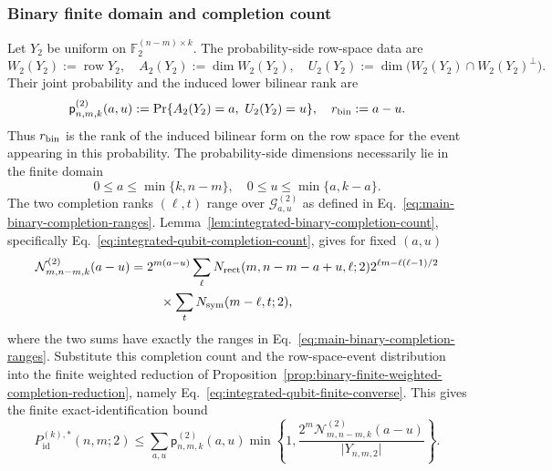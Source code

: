 \documentclass[11pt]{article}
\newcommand{\F}{\mathbb F}
\newcommand{\1}{\mathbf 1}
\theoremstyle{plain}
\theoremstyle{definition}
\theoremstyle{remark}
\begin{document}
\subsubsection{Binary finite domain and completion count}\label{subsubsec:binary-finite-domain-completion-count}
Let $Y_2$ be uniform on $\F_2^{(n-m)\times k}$.  The probability-side
row-space data are
\begin{equation}
 W_2(Y_2):=\operatorname{row}Y_2,
 \quad
 A_2(Y_2):=\dim W_2(Y_2),
 \quad
 U_2(Y_2):=\dim\bigl(W_2(Y_2)\cap W_2(Y_2)^\perp\bigr).
 \label{eq:main-binary-unreported-parameters}
\end{equation}
Their joint probability and the induced lower bilinear rank are
\begin{equation}
 \mathsf p_{n,m,k}^{(2)}(a,u)
 :=\Pr\{A_2(Y_2)=a,\ U_2(Y_2)=u\},
 \quad r_{\rm bin}:=a-u.
 \label{eq:main-binary-unreported-mass-function}
\end{equation}
Thus $r_{\rm bin}$ is the rank of the induced bilinear form on the row space
for the event appearing in this probability.
The probability-side dimensions necessarily lie in the finite domain
\begin{equation}
 0\le a\le\min\{k,n-m\},
 \quad 0\le u\le\min\{a,k-a\}.
 \label{eq:main-binary-unreported-ranges}
\end{equation}
The two completion ranks $(\ell,t)$ range over
$\mathcal G_{a,u}^{(2)}$ as defined in
Eq.~\eqref{eq:main-binary-completion-ranges}.
Lemma~\ref{lem:integrated-binary-completion-count}, specifically
Eq.~\eqref{eq:integrated-qubit-completion-count}, gives for fixed $(a,u)$
\begin{align}
 \mathcal N_{m,n-m,k}^{(2)}(a-u)
 ={}&2^{m(a-u)}
 \sum_{\ell}
 N_{\rm rect}(m,n-m-a+u,\ell;2)
 2^{\ell m-\ell(\ell-1)/2}\notag\\
 &\quad\times\sum_t N_{\rm sym}(m-\ell,t;2),
 \label{eq:main-binary-completion-count}
\end{align}
where the two sums have exactly the ranges in
Eq.~\eqref{eq:main-binary-completion-ranges}.  Substitute this completion count and the row-space-event distribution into
the finite weighted reduction of
Proposition~\ref{prop:binary-finite-weighted-completion-reduction}, namely
Eq.~\eqref{eq:integrated-qubit-finite-converse}.
This gives the finite exact-identification bound
\begin{equation}
 P_{\mathrm{id}}^{(k),*}(n,m;2)
 \le\sum_{a,u}\mathsf p_{n,m,k}^{(2)}(a,u)
 \min\left\{1,
 \frac{2^m\mathcal N_{m,n-m,k}^{(2)}(a-u)}
 {\lvert Y_{n,m,2}\rvert}\right\}.
 \label{eq:main-binary-finite-converse}
\end{equation}
\end{document}
